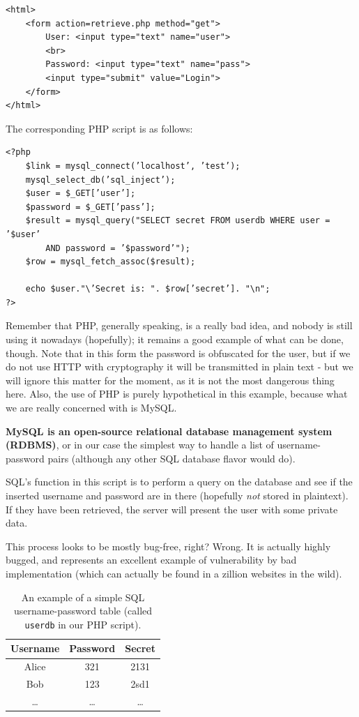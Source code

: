 \begin{verbatim}
<html>
    <form action=retrieve.php method="get">
        User: <input type="text" name="user">
        <br>
        Password: <input type="text" name="pass">
        <input type="submit" value="Login">
    </form>
</html>
\end{verbatim}

The corresponding PHP script is as follows:

\begin{verbatim}
<?php
    $link = mysql_connect(’localhost’, ’test’);
    mysql_select_db(’sql_inject’);
    $user = $_GET[’user’];
    $password = $_GET[’pass’];
    $result = mysql_query("SELECT secret FROM userdb WHERE user = ’$user’
        AND password = ’$password’");
    $row = mysql_fetch_assoc($result);
    
    echo $user."\’Secret is: ". $row[’secret’]. "\n";
?>
\end{verbatim}
 
Remember that PHP, generally speaking, is a really bad idea, and nobody is still using it nowadays (hopefully); it remains a good example of what can be done, though. Note that in this form the password is obfuscated for the user, but if we do not use HTTP with cryptography it will be transmitted in plain text - but we will ignore this matter for the moment, as it is not the most dangerous thing here. Also, the use of PHP is purely hypothetical in this example, because what we are really concerned with is MySQL.

\textbf{MySQL is an open-source relational database management system (RDBMS)}, or in our case the simplest way to handle a list of username-password pairs (although any other SQL database flavor would do).

SQL’s function in this script is to perform a query on the database and see if the inserted username and password are in there (hopefully \textit{not} stored in plaintext). If they have been retrieved, the server will present the user with some private data.

This process looks to be mostly bug-free, right? Wrong. It is actually highly bugged, and represents an excellent example of vulnerability by bad implementation (which can actually be found in a zillion websites in the wild).

\begin{table}[h]
    \centering
    \begin{tabular}{|c|c|c|}
        \hline
        \textbf{Username} & \textbf{Password} &\textbf{Secret} \\
        \hline
        Alice & 321 & 2131 \\
        Bob & 123 & 2sd1 \\
        … & … & …\\
        \hline
    \end{tabular}
        \decoRule
        \caption{An example of a simple SQL username-password table (called \texttt{userdb} in our PHP script).}
        \label{tab:sql_query}
\end{table}

